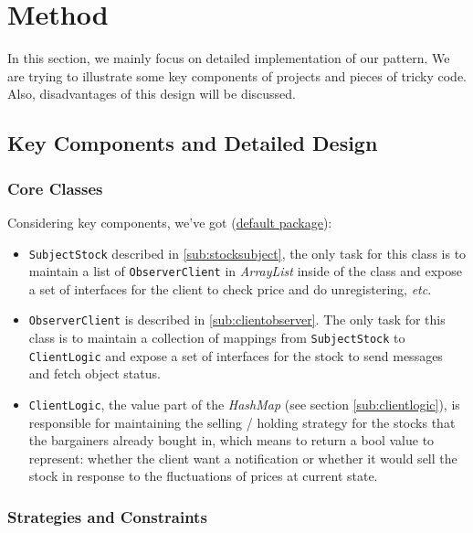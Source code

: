 \documentclass[a4paper]{article}
\begin{document}
\section{Method}%
\label{sec:method}

In this section, we mainly focus on detailed implementation of our pattern. We are trying to
illustrate some key components of projects and pieces of tricky code.
Also, disadvantages of this design will be discussed.

\subsection{Key Components and Detailed Design}%
\label{sub:key_components_and_detailed_design}

\subsubsection{Core Classes}

Considering key components, we've got (\underline{default package}):

\begin{itemize}
    \item \texttt{SubjectStock} described in \ref{sub:stocksubject}, the only task for this class
        is to maintain a list of \texttt{ObserverClient} in \textsl{ArrayList} inside
        of the class and expose a set of interfaces for the client to check price and do unregistering, \textit{etc}.
    \item \texttt{ObserverClient} is described in \ref{sub:clientobserver}. The only task for this class
        is to maintain a collection of mappings from \texttt{SubjectStock} to \texttt{ClientLogic} and expose
        a set of interfaces for the stock to send messages and fetch object status.
    \item \texttt{ClientLogic}, the value part of the \textsl{HashMap}
        (see section \ref{sub:clientlogic}),
        is responsible for maintaining the selling / holding strategy
        for the stocks that the bargainers already bought in, which means to
        return a bool value to represent: whether the client want a
        notification or whether it would sell the stock in response to
        the fluctuations of prices at current state.
\end{itemize}

\subsubsection{Strategies and Constraints}
\end{document}
